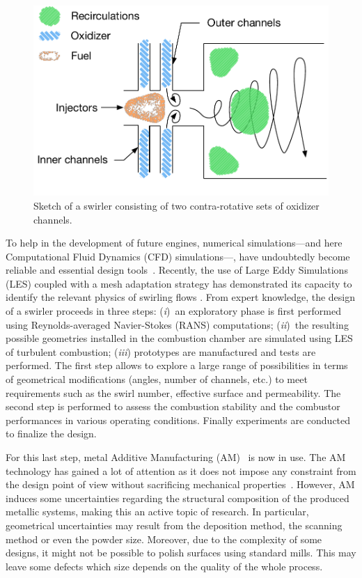 \begin{figure}[!h]
\centering
\includegraphics[width=\linewidth,keepaspectratio]{fig/applications/swirler/sketch_swirler.pdf}
\caption{Sketch of a swirler consisting of two contra-rotative sets of oxidizer channels.}
\label{fig:sketch-swirler}
\end{figure}

To help in the development of future engines, numerical simulations---and here Computational Fluid Dynamics (CFD) simulations---, have undoubtedly become reliable and essential design tools~\cite{Sacks1989,Forrester2009}. Recently, the use of Large Eddy Simulations (LES) coupled with a mesh adaptation strategy has demonstrated its capacity to identify the relevant physics of swirling flows \cite{Daviller2017}. 
From expert knowledge, the design of a swirler proceeds in three steps: (\emph{i})~an exploratory phase is first performed using Reynolds-averaged Navier-Stokes (RANS) computations; (\emph{ii})~the resulting possible geometries installed in the combustion chamber are simulated using LES of turbulent combustion; (\emph{iii}) prototypes are manufactured and tests are performed. The first step allows to explore a large range of possibilities in terms of geometrical modifications (angles, number of channels, etc.) to meet requirements such as the swirl number, effective surface and permeability. The second step is performed to assess the combustion stability and the combustor performances in various operating conditions. Finally experiments are conducted to finalize the design.

For this last step, metal Additive Manufacturing (AM)~\cite{Frazier2014,Sames2016} is now in use. The AM technology has gained a lot of attention as it does not impose any constraint from the design point of view without sacrificing mechanical properties~\cite{Lewandowski2016}. However, AM induces some uncertainties regarding the structural composition of the produced metallic systems, making this an active topic of research. In particular, geometrical uncertainties may result from the deposition method, the scanning method or even the powder size. Moreover, due to the complexity of some designs, it might not be possible to polish surfaces using standard mills. This may leave some defects which size depends on the quality of the whole process.

